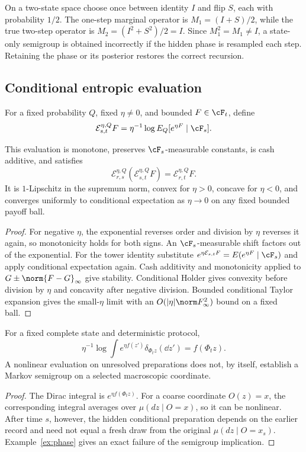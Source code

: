 \begin{example}\label{ex:phase}
On a two-state space choose once between identity $I$ and flip $S$, each with probability $1/2$. The one-step marginal operator is $M_1=(I+S)/2$, while the true two-step operator is $M_2=(I^2+S^2)/2=I$. Since $M_1^2=M_1\ne I$, a state-only semigroup is obtained incorrectly if the hidden phase is resampled each step. Retaining the phase or its posterior restores the correct recursion.
\end{example}

\subsection{Conditional entropic evaluation}
For a fixed probability $Q$, fixed $\eta\ne0$, and bounded $F\in\cF_t$, define
\[
 \mathcal E_{s,t}^{\eta,Q}F
 =\eta^{-1}\log E_Q[e^{\eta F}\mid\cF_s].
\]

\begin{proposition}\label{prop:entropic}
This evaluation is monotone, preserves $\cF_s$-measurable constants, is cash additive, and satisfies
\[
 \mathcal E_{r,s}^{\eta,Q}(\mathcal E_{s,t}^{\eta,Q}F)
 =\mathcal E_{r,t}^{\eta,Q}F.
\]
It is $1$-Lipschitz in the supremum norm, convex for $\eta>0$, concave for $\eta<0$, and converges uniformly to conditional expectation as $\eta\to0$ on any fixed bounded payoff ball.
\end{proposition}
\begin{proof}
For negative $\eta$, the exponential reverses order and division by $\eta$ reverses it again, so monotonicity holds for both signs. An $\cF_s$-measurable shift factors out of the exponential. For the tower identity substitute $e^{\eta\mathcal E_{s,t}F}=E(e^{\eta F}\mid\cF_s)$ and apply conditional expectation again. Cash additivity and monotonicity applied to $G\pm\norm{F-G}_\infty$ give stability. Conditional Holder gives convexity before division by $\eta$ and concavity after negative division. Bounded conditional Taylor expansion gives the small-$\eta$ limit with an $O(|\eta|\norm F_\infty^2)$ bound on a fixed ball.
\end{proof}

\begin{proposition}\label{prop:dirac-linear}
For a fixed complete state and deterministic protocol,
\[
 \eta^{-1}\log\int e^{\eta f(z')}\delta_{\Phi_tz}(\dd z')=f(\Phi_tz).
\]
A nonlinear evaluation on unresolved preparations does not, by itself, establish a Markov semigroup on a selected macroscopic coordinate.
\end{proposition}
\begin{proof}
The Dirac integral is $e^{\eta f(\Phi_tz)}$. For a coarse coordinate $O(z)=x$, the corresponding integral averages over $\mu(dz\mid O=x)$, so it can be nonlinear. After time $s$, however, the hidden conditional preparation depends on the earlier record and need not equal a fresh draw from the original $\mu(dz\mid O=x_s)$. Example~\ref{ex:phase} gives an exact failure of the semigroup implication.
\end{proof}

